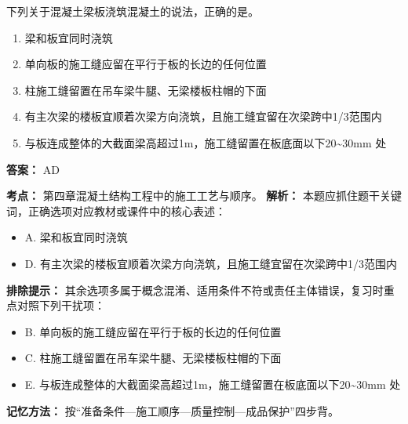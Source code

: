 \documentclass[UTF8,fontset=fandol,11pt]{ctexart}
\begin{document}
\begin{quizbox}[title={第 76 题}]
下列关于混凝土梁板浇筑混凝土的说法，正确的是。\\
\begin{enumerate}[label=\Alph*.]
\item 梁和板宜同时浇筑
\item 单向板的施工缝应留在平行于板的长边的任何位置
\item 柱施工缝留置在吊车梁牛腿、无梁楼板柱帽的下面
\item 有主次梁的楼板宜顺着次梁方向浇筑，且施工缝宜留在次梁跨中1/3范围内
\item 与板连成整体的大截面梁高超过1m，施工缝留置在板底面以下20\textasciitilde{}30mm 处
\end{enumerate}
\textbf{答案：} AD
\vspace{0.25em}
\begin{answerbox}[title={考点解析}]
\textbf{考点：} 第四章混凝土结构工程中的施工工艺与顺序。
\textbf{解析：} 本题应抓住题干关键词，正确选项对应教材或课件中的核心表述：
\begin{itemize}
\item A. 梁和板宜同时浇筑
\item D. 有主次梁的楼板宜顺着次梁方向浇筑，且施工缝宜留在次梁跨中1/3范围内
\end{itemize}
\textbf{排除提示：} 其余选项多属于概念混淆、适用条件不符或责任主体错误，复习时重点对照下列干扰项：
\begin{itemize}
\item B. 单向板的施工缝应留在平行于板的长边的任何位置
\item C. 柱施工缝留置在吊车梁牛腿、无梁楼板柱帽的下面
\item E. 与板连成整体的大截面梁高超过1m，施工缝留置在板底面以下20\textasciitilde{}30mm 处
\end{itemize}
\textbf{记忆方法：} 按“准备条件—施工顺序—质量控制—成品保护”四步背。
\end{answerbox}
\end{quizbox}
\end{document}
